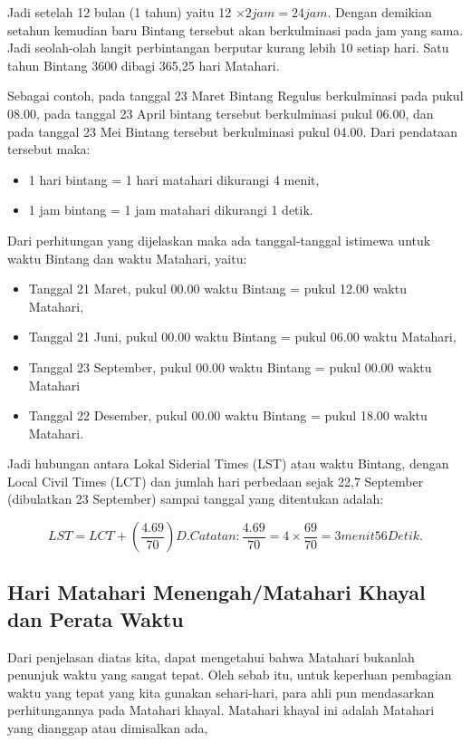 Jadi setelah 12 bulan (1 tahun) yaitu  12 $\times 2 jam = 24 jam$. Dengan demikian setahun
 kemudian baru Bintang tersebut akan berkulminasi pada jam yang sama. 
 Jadi seolah-olah langit perbintangan berputar kurang lebih 10 setiap hari. 
 Satu tahun Bintang 3600 dibagi 365,25 hari Matahari.

Sebagai contoh, pada tanggal 23 Maret Bintang Regulus berkulminasi pada pukul 08.00,
 pada tanggal 23 April bintang tersebut berkulminasi pukul 06.00, dan pada tanggal 23 Mei 
 Bintang tersebut berkulminasi pukul 04.00. Dari pendataan tersebut maka: 
\begin{itemize}
 \item 1 hari bintang = 1 hari matahari dikurangi 4 menit, 
 \item 1 jam bintang = 1 jam matahari dikurangi 1 detik. 
\end{itemize}
 Dari perhitungan yang dijelaskan maka ada tanggal-tanggal istimewa 
 untuk waktu Bintang dan waktu Matahari, yaitu:
 \begin{itemize}
	\item Tanggal 21 Maret, pukul 00.00 waktu Bintang = pukul 12.00 waktu Matahari,
	\item Tanggal 21 Juni, pukul 00.00 waktu Bintang = pukul 06.00 waktu Matahari,
	\item Tanggal 23 September, pukul 00.00 waktu Bintang = pukul 00.00 waktu Matahari
	\item Tanggal 22 Desember, pukul 00.00 waktu Bintang = pukul 18.00 waktu Matahari.
\end{itemize}
	

 Jadi hubungan antara Lokal Siderial Times (LST) atau waktu Bintang, 
 dengan Local Civil Times (LCT) dan jumlah hari perbedaan sejak 22,7 September 
 (dibulatkan 23 September) sampai tanggal yang ditentukan adalah:

\begin{equation}
 LST = LCT + (\frac{4.69}{70}) D. Catatan: \frac{4.69}{70} = 4 \times \frac{69}{70} = 3 menit 56 Detik.	
\end{equation}


\subsection{Hari Matahari Menengah/Matahari Khayal dan Perata Waktu}
 Dari penjelasan diatas kita, dapat mengetahui bahwa Matahari bukanlah penunjuk 
 waktu yang sangat tepat. Oleh sebab itu, untuk keperluan pembagian waktu yang tepat
 yang kita gunakan sehari-hari, para ahli pun mendasarkan perhitungannya pada Matahari
 khayal. Matahari khayal ini adalah Matahari yang dianggap atau dimisalkan ada, 

